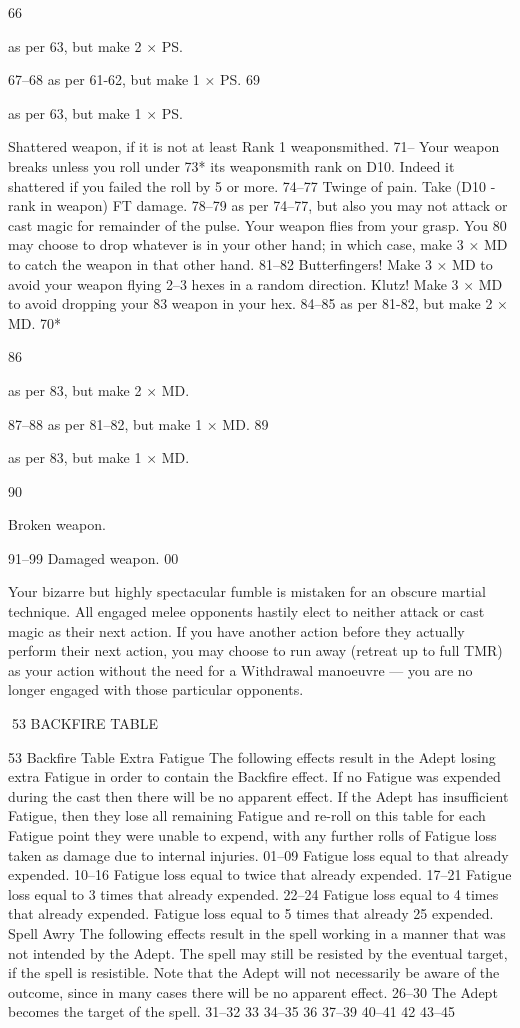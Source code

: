 \documentclass[a4paper]{article}
\begin{document}
\begin{multicols}{3}
66

as per 63, but make 2 × PS.

67–68 as per 61-62, but make 1 × PS.
69

as per 63, but make 1 × PS.

Shattered weapon, if it is not at least Rank 1
weaponsmithed.
71– Your weapon breaks unless you roll under
73* its weaponsmith rank on D10. Indeed it
shattered if you failed the roll by 5 or more.
74–77 Twinge of pain. Take (D10 - rank in
weapon) FT damage.
78–79 as per 74–77, but also you may not attack or
cast magic for remainder of the pulse.
Your weapon flies from your grasp. You
80
may choose to drop whatever is in your
other hand; in which case, make 3 × MD to
catch the weapon in that other hand.
81–82 Butterfingers! Make 3 × MD to avoid your
weapon flying 2–3 hexes in a random direction.
Klutz! Make 3 × MD to avoid dropping your
83
weapon in your hex.
84–85 as per 81-82, but make 2 × MD.
70*

86

as per 83, but make 2 × MD.

87–88 as per 81–82, but make 1 × MD.
89

as per 83, but make 1 × MD.

90

Broken weapon.

91–99 Damaged weapon.
00

Your bizarre but highly spectacular fumble
is mistaken for an obscure martial technique.
All engaged melee opponents hastily elect to
neither attack or cast magic as their next
action. If you have another action before
they actually perform their next action, you
may choose to run away (retreat up to full
TMR) as your action without the need for a
Withdrawal manoeuvre — you are no longer
engaged with those particular opponents.

53 BACKFIRE TABLE

53 Backfire Table
Extra Fatigue The following effects result in the
Adept losing extra Fatigue in order to contain the
Backfire effect. If no Fatigue was expended during
the cast then there will be no apparent effect. If the
Adept has insufficient Fatigue, then they lose all
remaining Fatigue and re-roll on this table for each
Fatigue point they were unable to expend, with any
further rolls of Fatigue loss taken as damage due to
internal injuries.
01–09 Fatigue loss equal to that already expended.
10–16 Fatigue loss equal to twice that already
expended.
17–21 Fatigue loss equal to 3 times that already
expended.
22–24 Fatigue loss equal to 4 times that already
expended.
Fatigue loss equal to 5 times that already
25
expended.
Spell Awry The following effects result in the
spell working in a manner that was not intended by
the Adept. The spell may still be resisted by the
eventual target, if the spell is resistible. Note that
the Adept will not necessarily be aware of the
outcome, since in many cases there will be no
apparent effect.
26–30 The Adept becomes the target of the spell.
31–32
33
34–35
36
37–39
40–41
42
43–45


\end{multicols}
\end{document}
